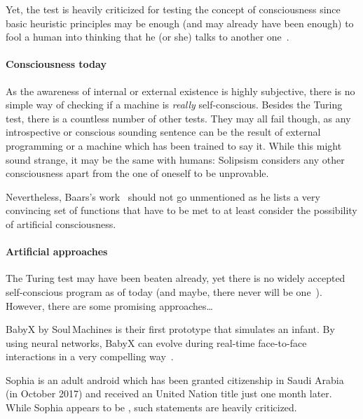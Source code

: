 Yet, the test is heavily criticized for testing the concept of consciousness since basic heuristic principles may be enough (and may already have been enough) to fool a human into thinking that he (or she) talks to another one~\cite{john1980minds}.

\paragraph{Consciousness today} As the awareness of internal or external existence is highly subjective, there is no simple way of checking if a machine is \emph{really} self-conscious. Besides the Turing test, there is a countless number of other tests. They may all fail though, as any introspective or conscious sounding sentence can be the result of external programming or a machine which has been trained to say it.
While this might sound strange, it may be the same with humans: Solipsism considers any other consciousness apart from the one of oneself to be unprovable.

Nevertheless, Baars's work~\cite{baars1993cognitive} should not go unmentioned as he lists a very convincing set of functions that have to be met to at least consider the possibility of artificial consciousness.


\paragraph{Artificial approaches}
The Turing test may have been beaten already, yet there is no widely accepted self-conscious program as of today (and maybe, there never will be one~\cite[p.~231]{Meissner2020}). However, there are some promising approaches\ldots

BabyX by Soul\,Machines is their first prototype that simulates an infant. By using neural networks, BabyX can evolve during real-time face-to-face interactions in a very compelling way~\cite{Sagar2015}.

Sophia is an adult android which has been granted citizenship in Saudi Arabia (in October 2017) and received an United Nation title just one month later. While Sophia appears to be , such statements are heavily criticized.

